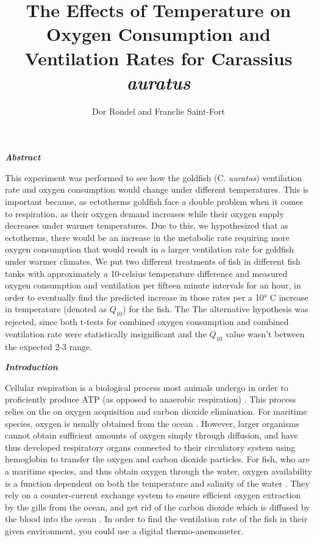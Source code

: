 \documentclass[11pt]{article}
\title{The Effects of Temperature on Oxygen Consumption and Ventilation Rates for Carassius \textit{auratus}}
\author{Dor Rondel and Franclie Saint-Fort}
\newcommand\sectiontitle[1]{\huge{\textit{\textbf{ #1 }}}}
\newcommand\spacer[1][5px]{\vspace{#1}}
\begin{document}
\maketitle

\newpage

\sectiontitle{Abstract}

\spacer

{\normalsize This experiment was performed to see how the goldfish (C. \textit{auratus}) ventilation rate and oxygen consumption would change under different temperatures. This is important because, as ectotherms goldfish face a double problem when it comes to respiration, as their oxygen demand increases while their oxygen supply decreases under warmer temperatures. Due to this, we hypothesized that as ectotherms, there would be an increase in the metabolic rate requiring more oxygen consumption that would result in a larger ventilation rate for goldfish under warmer climates. We put two different treatments of fish in different fish tanks with approximately a 10-celsius temperature difference and measured oxygen consumption and ventilation per fifteen minute intervals for an hour, in order to eventually find the predicted increase in those rates per a 10° C increase in temperature (denoted as $Q_{10}$) for the fish. The The alternative hypothesis was rejected, since both t-tests for combined oxygen consumption and combined ventilation rate were statistically insignificant and the $Q_{10}$ value wasn’t between the expected 2-3 range.}

\spacer\spacer

\sectiontitle{Introduction}

\spacer

{\normalsize Cellular respiration is a biological process most animals undergo in order to proficiently produce ATP (as opposed to anaerobic respiration) \cite{herb}. This process relies on the on oxygen acquisition and carbon dioxide elimination. For maritime species, oxygen is usually obtained from the ocean \cite{sadej}. However, larger organisms cannot obtain sufficient amounts of oxygen simply through diffusion, and have thus developed respiratory organs connected to their circulatory system using hemoglobin to transfer the oxygen and carbon dioxide particles. For fish, who are a maritime species, and thus obtain oxygen through the water, oxygen availability is a function dependent on both the temperature and salinity of the water \cite{reim}. They rely on a counter-current exchange system to ensure efficient oxygen extraction by the gills from the ocean, and get rid of the carbon dioxide which is diffused by the blood into the ocean \cite{wells}. In order to find the ventilation rate of the fish in their given environment, you could use a digital thermo-anemometer. }
\end{document}
